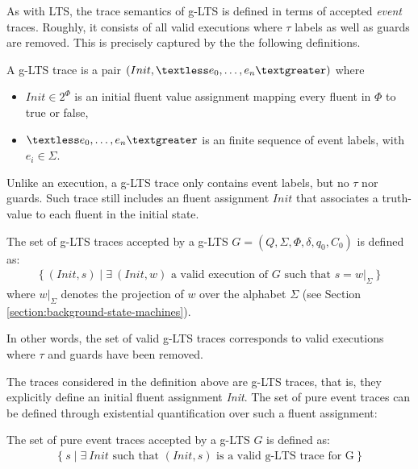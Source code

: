 As with LTS, the trace semantics of g-LTS is defined in terms of accepted \emph{event} traces. Roughly, it consists of all valid executions where $\tau$ labels as well as guards are removed. This is precisely captured by the the following definitions.

\begin{definition}
A g-LTS trace is a pair $(Init,\textless e_0,\ldots,e_n\textgreater)$ where 
\begin{itemize}
\item $Init \in 2^\Phi$ is an initial fluent value assignment mapping every fluent in $\Phi$ to true or false,
\item $\textless e_0,\ldots,e_n \textgreater$ is an finite sequence of event labels, with $e_i \in \Sigma$.
\end{itemize}
\end{definition}

Unlike an execution, a g-LTS trace only contains event labels, but no $\tau$ nor guards. Such trace still includes an fluent assignment $Init$ that associates a truth-value to each fluent in the initial state.

\begin{definition}
The set of g-LTS traces accepted by a g-LTS $G = (Q,\Sigma,\Phi,\delta,q_{0},C_{0})$ is defined as:
\begin{align*}
\{~(Init, s) \mid \exists~(Init, w) \mbox{~a valid execution of $G$ such that~} s = w|_{\Sigma}~\}
\end{align*}
where $w|_{\Sigma}$ denotes the projection of $w$ over the alphabet $\Sigma$ (see Section \ref{section:background-state-machines}).
\label{definition:valid-glts-traces}
\end{definition}

In other words, the set of valid g-LTS traces corresponds to valid executions where $\tau$ and guards have been removed. 

The traces considered in the definition above are g-LTS traces, that is, they explicitly define an initial fluent assignment \emph{Init}. The set of pure event traces can be defined through existential quantification over such a fluent assignment:

\begin{definition}
The set of pure event traces accepted by a g-LTS $G$ is defined as:
\begin{align*}
\{~ s \mid \exists~Init \mbox{~such that~} (Init,s) \mbox{~is a valid g-LTS trace for G}~\}
\end{align*}
\label{definition:glts-trace-semantics}
\end{definition}

